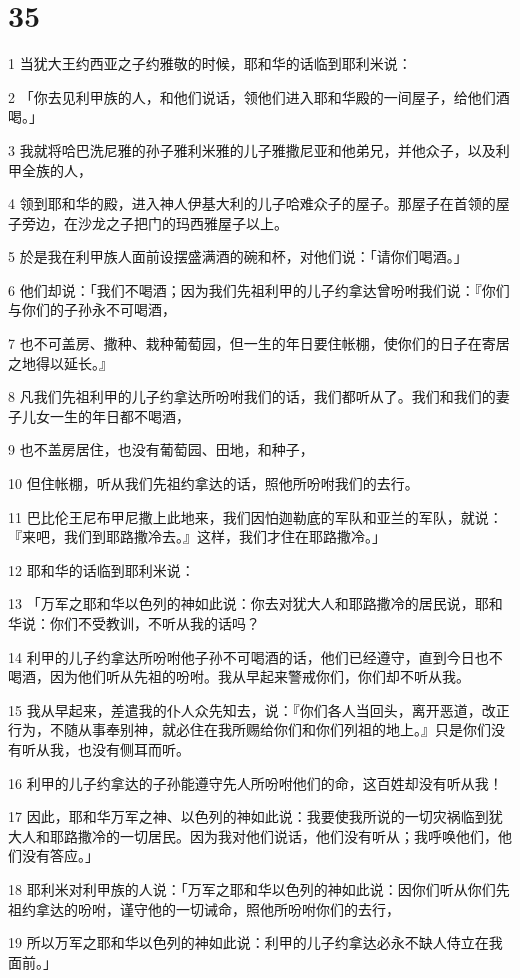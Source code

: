 \chapter{35}

\par 1 当犹大王约西亚之子约雅敬的时候，耶和华的话临到耶利米说：
\par 2 「你去见利甲族的人，和他们说话，领他们进入耶和华殿的一间屋子，给他们酒喝。」
\par 3 我就将哈巴洗尼雅的孙子雅利米雅的儿子雅撒尼亚和他弟兄，并他众子，以及利甲全族的人，
\par 4 领到耶和华的殿，进入神人伊基大利的儿子哈难众子的屋子。那屋子在首领的屋子旁边，在沙龙之子把门的玛西雅屋子以上。
\par 5 於是我在利甲族人面前设摆盛满酒的碗和杯，对他们说：「请你们喝酒。」
\par 6 他们却说：「我们不喝酒；因为我们先祖利甲的儿子约拿达曾吩咐我们说：『你们与你们的子孙永不可喝酒，
\par 7 也不可盖房、撒种、栽种葡萄园，但一生的年日要住帐棚，使你们的日子在寄居之地得以延长。』
\par 8 凡我们先祖利甲的儿子约拿达所吩咐我们的话，我们都听从了。我们和我们的妻子儿女一生的年日都不喝酒，
\par 9 也不盖房居住，也没有葡萄园、田地，和种子，
\par 10 但住帐棚，听从我们先祖约拿达的话，照他所吩咐我们的去行。
\par 11 巴比伦王尼布甲尼撒上此地来，我们因怕迦勒底的军队和亚兰的军队，就说：『来吧，我们到耶路撒冷去。』这样，我们才住在耶路撒冷。」
\par 12 耶和华的话临到耶利米说：
\par 13 「万军之耶和华以色列的神如此说：你去对犹大人和耶路撒冷的居民说，耶和华说：你们不受教训，不听从我的话吗？
\par 14 利甲的儿子约拿达所吩咐他子孙不可喝酒的话，他们已经遵守，直到今日也不喝酒，因为他们听从先祖的吩咐。我从早起来警戒你们，你们却不听从我。
\par 15 我从早起来，差遣我的仆人众先知去，说：『你们各人当回头，离开恶道，改正行为，不随从事奉别神，就必住在我所赐给你们和你们列祖的地上。』只是你们没有听从我，也没有侧耳而听。
\par 16 利甲的儿子约拿达的子孙能遵守先人所吩咐他们的命，这百姓却没有听从我！
\par 17 因此，耶和华万军之神、以色列的神如此说：我要使我所说的一切灾祸临到犹大人和耶路撒冷的一切居民。因为我对他们说话，他们没有听从；我呼唤他们，他们没有答应。」
\par 18 耶利米对利甲族的人说：「万军之耶和华以色列的神如此说：因你们听从你们先祖约拿达的吩咐，谨守他的一切诫命，照他所吩咐你们的去行，
\par 19 所以万军之耶和华以色列的神如此说：利甲的儿子约拿达必永不缺人侍立在我面前。」


